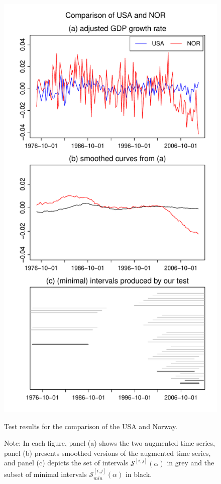 \documentclass[a4paper,12pt]{article}
\begin{document}
\begin{figure}[t!]
\begin{minipage}[t]{0.49\textwidth}
\includegraphics[width=\textwidth]{output/plots/gdp/USA_vs_NOR}
\caption{Test results for the comparison of the USA and Norway.}\label{fig:USA:Norway}
\end{minipage}
\caption*{Note: In each figure, panel (a) shows the two augmented time series, panel (b) presents smoothed versions of the augmented time series, and panel (c) depicts the set of intervals $\mathcal{S}^{[i, j]}(\alpha)$ in grey and the subset of minimal intervals $\mathcal{S}^{[i, j]}_{min}(\alpha)$ in black.}
\end{figure}
\end{document}
